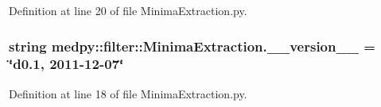 Definition at line 20 of file MinimaExtraction.py.

\hypertarget{namespacemedpy_1_1filter_1_1MinimaExtraction_a8517b3289b06606c7c3a60ef1d80afea}{
\subsubsection[{\_\-\_\-version\_\-\_\-}]{\setlength{\rightskip}{0pt plus 5cm}string {\bf medpy::filter::MinimaExtraction.\_\-\_\-version\_\-\_\-} = \char`\"{}d0.1, 2011-\/12-\/07\char`\"{}}}
\label{namespacemedpy_1_1filter_1_1MinimaExtraction_a8517b3289b06606c7c3a60ef1d80afea}


Definition at line 18 of file MinimaExtraction.py.

